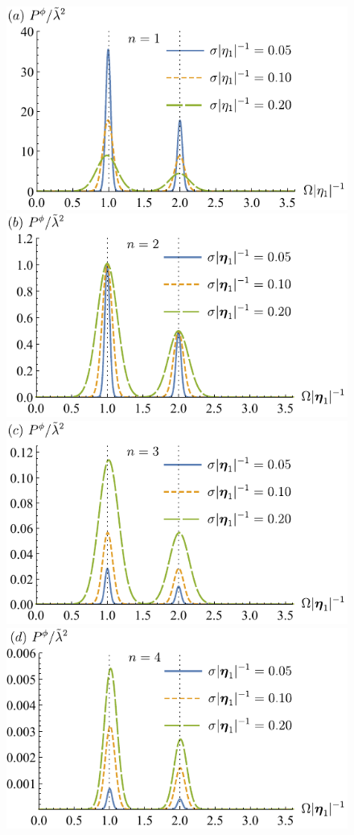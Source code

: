 \documentclass[11pt,prd,onecolumn,superscriptaddress,nofootinbib,floatfix,amsmath,amssymb]{revtex4-2}
\begin{document}
    \begin{figure}[tp]
        \centering
        \includegraphics[scale=0.825]{Fig4a.pdf}
        \includegraphics[scale=0.825]{Fig4b.pdf}
        \includegraphics[scale=0.825]{Fig4c.pdf}
        \includegraphics[scale=0.825]{Fig4d.pdf}

\end{figure}
\end{document}
